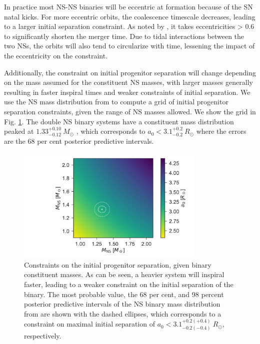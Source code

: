 \documentclass[referee]{aa}
\begin{document}
In practice most NS-NS binaries will be eccentric at formation because of the SN
natal kicks. For more eccentric orbits, the coalescence timescale decreases,
leading to a larger initial separation constraint. As noted by
\citet{Postnov2014}, it takes eccentricities > 0.6 to significantly shorten the
merger time. Due to tidal interactions between the two NSs, the orbits will also
tend to circularize with time, lessening the impact of the eccentricity on the
constraint.

Additionally, the constraint on initial progenitor separation will change
depending on the mass assumed for the constituent NS masses, with larger masses
generally resulting in faster inspiral times and weaker constraints of initial
separation. We use the NS mass distribution from \citet{Kiziltan2013} to compute
a grid of initial progenitor separation constraints, given the range of NS
masses allowed. We show the grid in Fig. \ref{fig:prog_sep}. The double NS
binary systems have a constituent mass distribution peaked at
$1.33^{+0.10}_{-0.12}~M_\odot$ \citep{Kiziltan2013}, which corresponds to  $a_0 <
3.1^{+0.2}_{-0.2}~R_\odot$ where the errors are the 68 per cent posterior
predictive intervals.

\begin{figure}
	\centering
	\includegraphics[width=9cm]{figures/prog_sep.pdf}
	\caption{Constraints on the initial progenitor separation, given binary constituent masses. As can be seen, a heavier system will inspiral faster, leading to a weaker constraint on the initial separation of the binary. The most probable value, the 68 per cent, and 98 percent posterior predictive intervals of the NS binary mass distribution from \citet{Kiziltan2013} are shown with the dashed ellipses, which corresponds to a constraint on maximal initial separation of $a_0 <3.1^{+0.2(+0.4)}_{-0.2(-0.4)}~R_\odot$, respectively.}
	\label{fig:prog_sep}
\end{figure}
\end{document}

